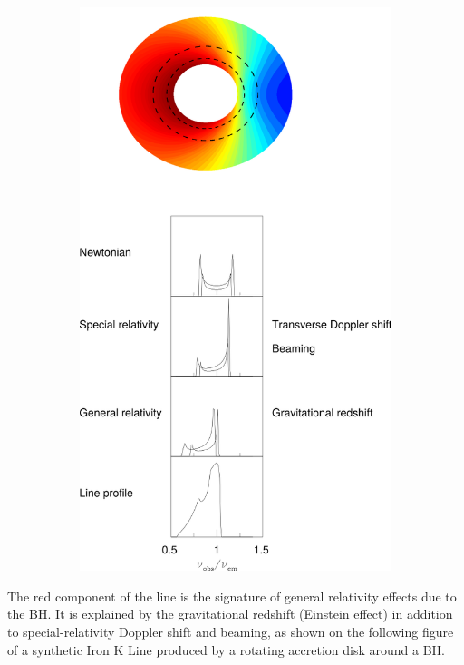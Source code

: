 \documentclass[10pt,a4paper,english]{article}
\begin{document}
\begin{figure}[!ht]
\begin{subfigure}[t]{.395\textwidth}
    \includegraphics[width=\columnwidth]{figures/fabian2000.png}
    \label{fig:fabian2000}
    \caption{\cite{Fabian2000}}
  \end{subfigure}
\end{figure}

The red component of the line is the signature of general relativity effects
due to the BH. It is explained by the gravitational redshift (Einstein effect)
in addition to special-relativity Doppler shift and beaming, as shown on the
following figure of a synthetic Iron K Line produced by a rotating accretion
disk around a BH.
\end{document}
